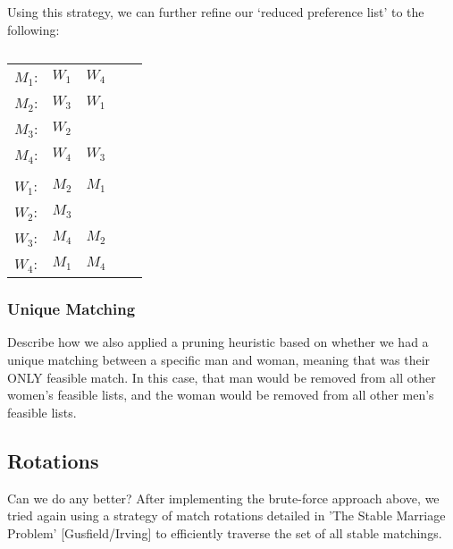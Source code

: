 \documentclass[a4paper]{article}
\begin{document}
Using this strategy, we can further refine our `reduced preference list' to the following:
\begin{table}[H]
\caption{}
\begin{tabular}{lllll}
$M_1$: & $W_1$ & $W_4$ & &       \\
$M_2$: & $W_3$ & $W_1$ \\
$M_3$: & $W_2$ & & &          \\
$M_4$: & $W_4$ & $W_3$ & &       \\
                        \\
$W_1$: & $M_2$ & $M_1$ &    \\
$W_2$: & $M_3$ & & &          \\
$W_3$: & $M_4$ & $M_2$ & &       \\
$W_4$: & $M_1$ & $M_4$ & &       \\
\end{tabular}
\end{table}

\subsubsection{Unique Matching}
Describe how we also applied a pruning heuristic based on whether we had a unique matching between a specific man and woman, meaning that was their ONLY feasible match.  In this case, that man would be removed from all other women's feasible lists, and the woman would be removed from all other men's feasible lists.

\subsection{Rotations}
Can we do any better? After implementing the brute-force approach above, we tried again using a strategy of match rotations detailed in 'The Stable Marriage Problem' [Gusfield/Irving] to efficiently traverse the set of all stable matchings.
\end{document}
